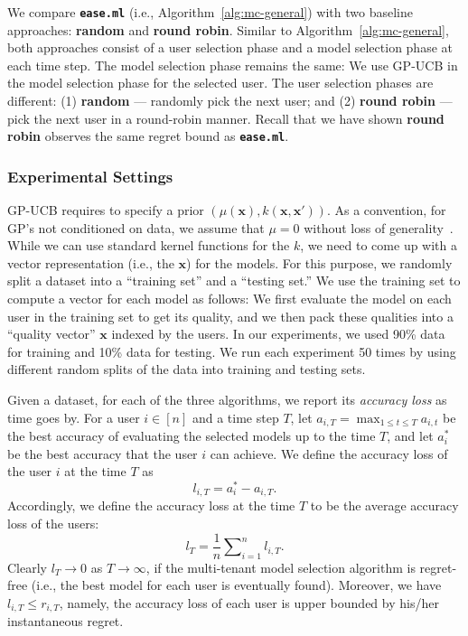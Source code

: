 \documentclass[letterpaper]{vldb}
\newcommand{\eml}{\texttt{ease.ml}\xspace}
\begin{document}
We compare {\bf \eml} (i.e., Algorithm~\ref{alg:mc-general}) with two baseline approaches: {\bf random} and {\bf round robin}.
Similar to Algorithm~\ref{alg:mc-general}, both approaches consist of a user selection phase and a model selection phase at each time step.
The model selection phase remains the same: We use GP-UCB in the model selection phase for the selected user.
The user selection phases are different: (1) {\bf random} --- randomly pick the next user; and (2) {\bf round robin} --- pick the next user in a round-robin manner.
Recall that we have shown {\bf round robin} observes the same regret bound as {\bf \eml}. %

\subsubsection{Experimental Settings}

GP-UCB requires to specify a prior $(\mu(\mathbf{x}), k(\mathbf{x},\mathbf{x}'))$.
As a convention, for GP's not conditioned on data, we assume that $\mu=0$ without loss of generality~\cite{SrinivasKKS10}.
While we can use standard kernel functions for the $k$, we need to come up with a vector representation (i.e., the $\mathbf{x}$) for the models.
For this purpose, we randomly split a dataset into a ``training set'' and a ``testing set.''
We use the training set to compute a vector for each model as follows:
We first evaluate the model on each user in the training set to get its quality, and we then pack these qualities into a ``quality vector'' $\mathbf{x}$ indexed by the users.
In our experiments, we used 90\% data for training and 10\% data for testing.
We run each experiment 50 times by using different random splits of the data into training and testing sets.

Given a dataset, for each of the three algorithms, we report its \emph{accuracy loss} as time goes by.
For a user $i\in[n]$ and a time step $T$, let $a_{i,T}=\max_{1\leq t\leq T} a_{i,t}$ be the best accuracy of evaluating the selected models up to the time $T$, and let $a_i^{*}$ be the best accuracy that the user $i$ can achieve.
We define the accuracy loss of the user $i$ at the time $T$ as
\begin{equation}
l_{i,T}=a_i^{*}-a_{i,T}.
\end{equation}
Accordingly, we define the accuracy loss at the time $T$ to be the average accuracy loss of the users:
\begin{equation}\label{eq:accuracy-loss}
l_T=\frac{1}{n}\sum\nolimits_{i=1}^{n}l_{i,T}.
\end{equation}
Clearly $l_T\to 0$ as $T\to\infty$, if the multi-tenant model selection algorithm is regret-free (i.e., the best model for each user is eventually found).
Moreover, we have $l_{i,T}\leq r_{i,T}$, namely, the accuracy loss of each user is upper bounded by his/her instantaneous regret.
\end{document}
